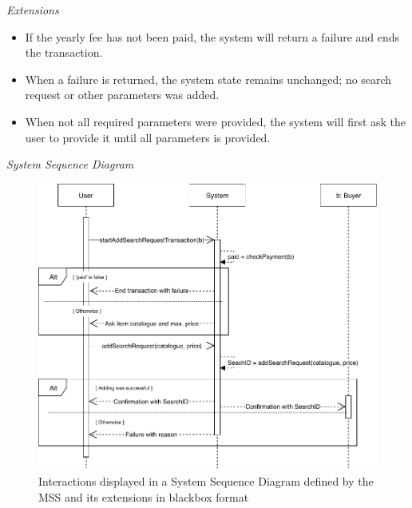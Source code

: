 \textsl{Extensions}
\begin{itemize}[noitemsep]
	\item If the yearly fee has not been paid, the system will return a failure and ends the transaction.
	\item When a failure is returned, the system state remains unchanged; no search request or other parameters was added.
	\item When not all required parameters were provided, the system will first ask the user to provide it until all parameters is provided.
\end{itemize}
\textsl{System Sequence Diagram}
\begin{figure}[H]
	\centering
	\includegraphics[scale=1]{SD-bb-createsearch.pdf}
	\caption*{Interactions displayed in a System Sequence Diagram defined by the MSS and its extensions in blackbox format}
\end{figure}